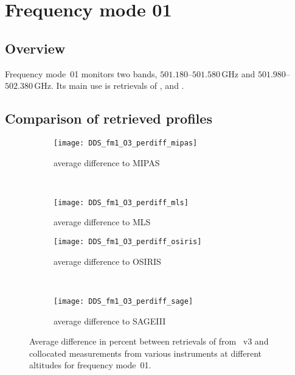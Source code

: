 \section{Frequency mode 01}
\label{sec:fm01}

\subsection{Overview}
\label{sec:fm01:overview}
Frequency mode~01 monitors two bands, $501.180$--$501.580\,\mathrm{GHz}$ and
$501.980$--$502.380\,\mathrm{GHz}$. Its main use is retrievals of ,
 and .

\subsection{Comparison of retrieved profiles}
\label{sec:fm01:comparison}



\begin{figure}[htpb]
    \centering
    \begin{subfigure}[b]{0.49\textwidth}
        \texttt{[image: DDS\_fm1\_O3\_perdiff\_mipas]}
        \caption{average difference to MIPAS}
        \label{fig:fm01:O3:profiles:MIPAS}
    \end{subfigure}
    \,
    \begin{subfigure}[b]{0.49\textwidth}
        \texttt{[image: DDS\_fm1\_O3\_perdiff\_mls]}
        \caption{average difference to MLS}
        \label{fig:fm01:O3:profiles:MLS}
    \end{subfigure}

    \begin{subfigure}[b]{0.49\textwidth}
        \texttt{[image: DDS\_fm1\_O3\_perdiff\_osiris]}
        \caption{average difference to OSIRIS}
        \label{fig:fm01:O3:profiles:OSIRIS}
    \end{subfigure}
    \,
    \begin{subfigure}[b]{0.49\textwidth}
        \texttt{[image: DDS\_fm1\_O3\_perdiff\_sage]}
        \caption{average difference to SAGEIII}
        \label{fig:fm01:O3:profiles:SAGEIII}
    \end{subfigure}
    \caption{Average difference in percent between retrievals of 
    from \smr~v3 and collocated measurements from various instruments at
    different altitudes for frequency mode~01.}
    \label{fig:fm01:O3:profiles}
\end{figure}

